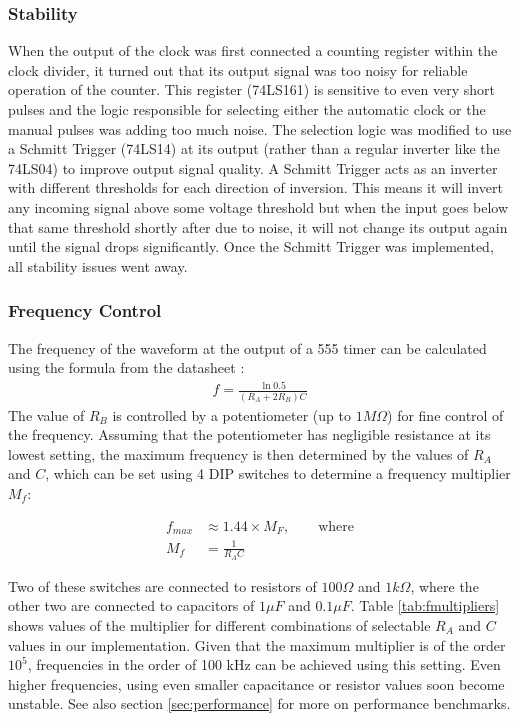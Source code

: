 \subsubsection*{Stability}
When the output of the clock was first connected a counting register within the clock divider, it turned out that its output signal was too noisy for reliable operation of the counter. This register (74LS161) is sensitive to even very short pulses and the logic responsible for selecting either the automatic clock or the manual pulses was adding too much noise. The selection logic was modified to use a Schmitt Trigger (74LS14) at its output (rather than a regular inverter like the 74LS04) to improve output signal quality. A Schmitt Trigger acts as an inverter with different thresholds for each direction of inversion. This means it will invert any incoming signal above some voltage threshold but when the input goes below that same threshold shortly after due to noise, it will not change its output again until the signal drops significantly. Once the Schmitt Trigger was implemented, all stability issues went away.

\subsubsection*{Frequency Control}
The frequency of the waveform at the output of a 555 timer can be calculated using the formula from the datasheet \cite{datasheet:555}:
\begin{align}
  f=\frac{\ln{0.5}}{\left(R_A + 2R_B\right)C}
\end{align}
The value of $R_B$ is controlled by a potentiometer (up to $1M\Omega$) for fine control of the frequency. Assuming that the potentiometer has negligible resistance at its lowest setting, the maximum frequency is then determined by the values of $R_A$ and $C$, which can be set using 4 DIP switches to determine a frequency multiplier $M_f$:

\begin{align}
  f_{max} &\approx 1.44 \times M_F,\qquad \mathrm{where} \\
  M_f &= \frac{1}{R_AC} \label{eq:mf}
\end{align}

Two of these switches are connected to resistors of $100\Omega$ and $1k\Omega$, where the other two are connected to capacitors of $1\mu F$ and $0.1\mu F$. Table \ref{tab:fmultipliers} shows values of the multiplier for different combinations of selectable $R_A$ and $C$ values in our implementation. Given that the maximum multiplier is of the order $10^5$, frequencies in the order of 100 kHz can be achieved using this setting. Even higher frequencies, using even smaller capacitance or resistor values soon become unstable. See also section \ref{sec:performance} for more on performance benchmarks.


